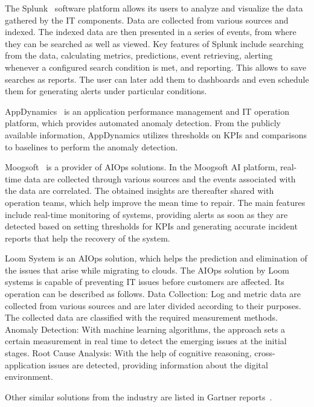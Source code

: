 The Splunk~\cite{zadrozny2013big} software platform allows its users to analyze and visualize the data gathered by the IT components. Data are collected from various sources and indexed. The indexed data are then presented in a series of events, from where they can be searched as well as viewed. Key features of Splunk include searching from the data, calculating metrics, predictions, event retrieving, alerting whenever a configured search condition is met, and reporting. This allows to save searches as reports. The user can later add them to dashboards and even schedule them for generating alerts under particular conditions.

AppDynamics~\cite{bansal2015automatic,bansal2015monitoring,bansal2015conducting} is an application performance management and IT operation platform, which provides automated anomaly detection. From the publicly available information, AppDynamics utilizes thresholds on KPIs and comparisons to baselines to perform the anomaly detection.

Moogsoft~\cite{tee2016system,tee2017alert} is a provider of AIOps solutions. In the Moogsoft AI platform, real-time data are collected through various sources and the events associated with the data are correlated. The obtained insights are thereafter shared with operation teams, which help improve the mean time to repair. The main features include real-time monitoring of systems, providing alerts as soon as they are detected based on setting thresholds for KPIs and generating accurate incident reports that help the recovery of the system.

Loom System is an AIOps solution, which helps the prediction and elimination of the issues that arise while migrating to clouds. The AIOps solution by Loom systems is capable of preventing IT issues before customers are affected. Its operation can be described as follows. Data Collection: Log and metric data are collected from various sources and are later divided according to their purposes. The collected data are classified with the required measurement methods.
Anomaly Detection: With machine learning algorithms, the approach sets a certain measurement in real time to detect the emerging issues at the initial stages. Root Cause Analysis: With the help of cognitive reasoning, cross-application issues are detected, providing information about the digital environment.

Other similar solutions from the industry are listed in Gartner reports~\cite{gartnermarketguide,gartnerinc}.

